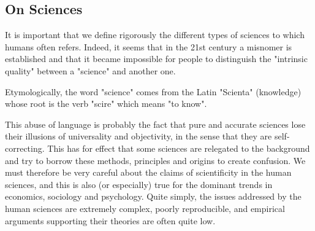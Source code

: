 	\subsection{On Sciences}	
	It is important that we define rigorously the different types of sciences to which humans often refers. Indeed, it seems that in the 21st century a misnomer is established and that it became impossible for people to distinguish the "intrinsic quality" between a "science" and another one.

	\begin{tcolorbox}[title=Remark,colframe=black,arc=10pt]
Etymologically, the word "science" comes from the Latin "Scienta" (knowledge) whose root is the verb "scire" which means "to know".
	\end{tcolorbox}

This abuse of language is probably the fact that pure and accurate sciences lose their illusions of universality and objectivity, in the sense that they are self-correcting. This has for effect that some sciences are relegated to the background and try to borrow these methods, principles and origins to create confusion. We must therefore be very careful about the claims of scientificity in the human sciences, and this is also (or especially) true for the dominant trends in economics, sociology and psychology. Quite simply, the issues addressed by the human sciences are extremely complex, poorly reproducible, and empirical arguments supporting their theories are often quite low.

